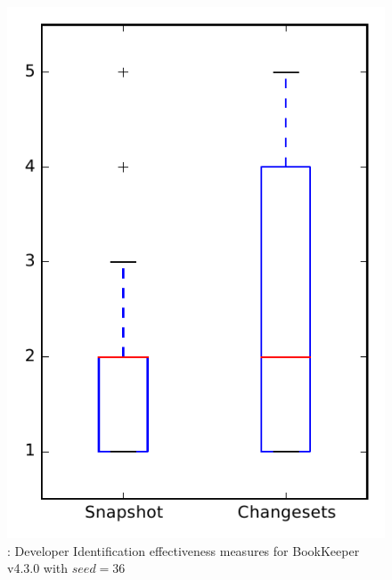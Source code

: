 
\begin{figure}
\centering
\includegraphics[height=0.4\textheight]{figures/dit_seed/rq1_bookkeeper_36}
\caption{\rtwo: Developer Identification effectiveness measures for BookKeeper v4.3.0 with $seed=36$}
\label{fig:dit_seed:rq1:bookkeeper}
\end{figure}
